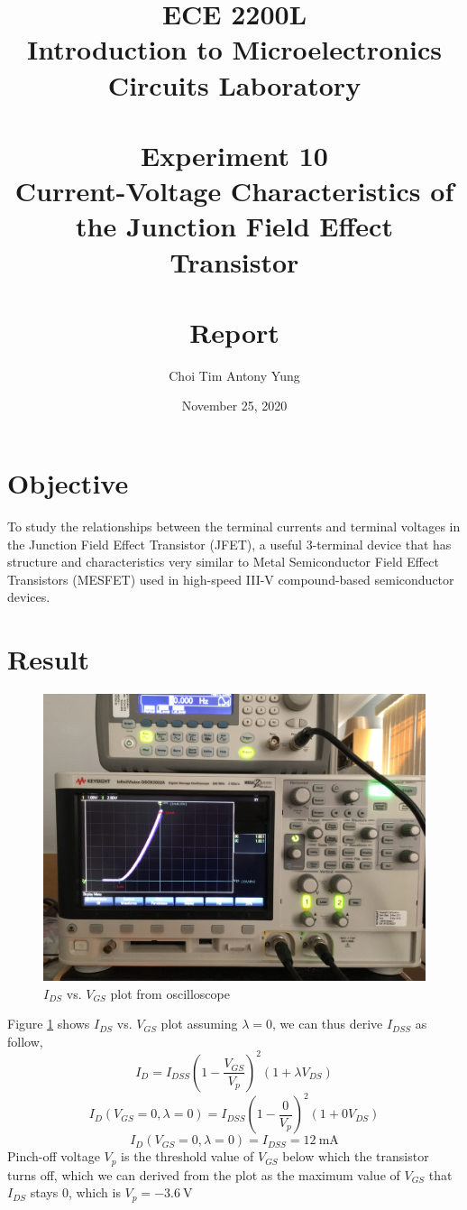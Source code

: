 \documentclass{article}
\title{ECE 2200L\\Introduction to Microelectronics Circuits Laboratory\\\,\\Experiment 10\\Current-Voltage Characteristics of the Junction Field Effect Transistor\\\,\\Report}
\author{Choi Tim Antony Yung}
\date{November 25, 2020}
\begin{document}
\maketitle

\thispagestyle{empty}
\setcounter{page}{0}

\newpage

\section*{Objective}
To study the relationships between the terminal currents and terminal voltages in the Junction Field Effect Transistor (JFET), a useful 3-terminal device that has structure and characteristics very similar to Metal Semiconductor Field Effect Transistors (MESFET) used in high-speed III-V compound-based semiconductor devices.
\section*{Result}

\begin{figure}[H]
  \centering
  \includegraphics[width=\textwidth]{ECE2200L_Lab10_IVgs.JPG}
  \caption{$I_{DS}$ vs. $V_{GS}$ plot from oscilloscope}
  \label{fig:ivgs}
\end{figure}

Figure \ref{fig:ivgs} shows $I_{DS}$ vs. $V_{GS}$ plot assuming $\lambda = 0$, we can thus derive $I_{DSS}$ as follow,
$$I_D = I_{DSS} \left(1-\frac{V_{GS}}{V_p}\right)^2(1+\lambda V_{DS})$$
$$I_D(V_{GS} = 0, \lambda = 0) = I_{DSS} \left(1-\frac{0}{V_p}\right)^2(1+0 V_{DS})$$
$$I_D(V_{GS} = 0, \lambda = 0) = I_{DSS} = \SI{12}{\milli\ampere}$$
Pinch-off voltage $V_p$ is the threshold value of $V_{GS}$ below which the transistor turns off, which we can derived from the plot as the maximum value of $V_{GS}$ that $I_{DS}$ stays 0, which is $V_p = \SI{-3.6}{\volt}$
\end{document}
